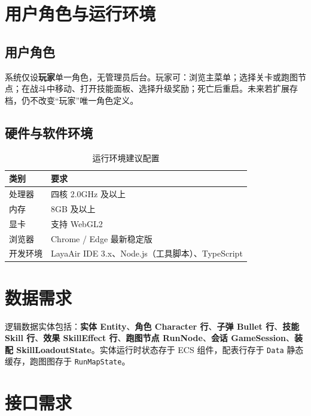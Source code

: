 
\section{用户角色与运行环境}

\subsection{用户角色}

系统仅设\textbf{玩家}单一角色，无管理员后台。玩家可：浏览主菜单；选择关卡或跑图节点；在战斗中移动、打开技能面板、选择升级奖励；死亡后重启。未来若扩展存档，仍不改变“玩家”唯一角色定义。

\subsection{硬件与软件环境}

\begin{table}[htbp]
  \centering
  \caption{运行环境建议配置}
  \begin{tabular}{ll}
    \toprule
    \textbf{类别} & \textbf{要求} \\
    \midrule
    处理器 & 四核 2.0GHz 及以上 \\
    内存 & 8GB 及以上 \\
    显卡 & 支持 WebGL2 \\
    浏览器 & Chrome / Edge 最新稳定版 \\
    开发环境 & LayaAir IDE 3.x、Node.js（工具脚本）、TypeScript \\
    \bottomrule
  \end{tabular}
\end{table}

\section{数据需求}

逻辑数据实体包括：\textbf{实体 Entity}、\textbf{角色 Character 行}、\textbf{子弹 Bullet 行}、\textbf{技能 Skill 行}、\textbf{效果 SkillEffect 行}、\textbf{跑图节点 RunNode}、\textbf{会话 GameSession}、\textbf{装配 SkillLoadoutState}。实体运行时状态存于 ECS 组件，配表行存于 \texttt{Data} 静态缓存，跑图图存于 \texttt{RunMapState}。

\section{接口需求}

